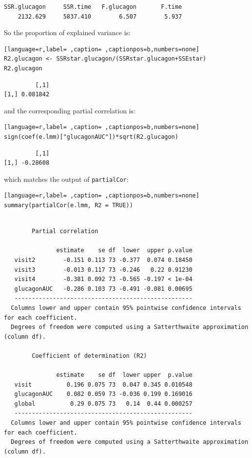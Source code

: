 \documentclass[12pt]{article}
\begin{document}
\begin{verbatim}
SSR.glucagon     SSR.time   F.glucagon       F.time 
    2132.629     5837.410        6.507        5.937
\end{verbatim}


So the proportion of explained variance is:
\begin{lstlisting}[language=r,label= ,caption= ,captionpos=b,numbers=none]
R2.glucagon <- SSRstar.glucagon/(SSRstar.glucagon+SSEstar)
R2.glucagon
\end{lstlisting}

\begin{verbatim}
         [,1]
[1,] 0.081842
\end{verbatim}


and the corresponding partial correlation is:
\begin{lstlisting}[language=r,label= ,caption= ,captionpos=b,numbers=none]
sign(coef(e.lmm)["glucagonAUC"])*sqrt(R2.glucagon)
\end{lstlisting}

\begin{verbatim}
         [,1]
[1,] -0.28608
\end{verbatim}


which matches the output of \texttt{partialCor}:
\begin{lstlisting}[language=r,label= ,caption= ,captionpos=b,numbers=none]
summary(partialCor(e.lmm, R2 = TRUE))
\end{lstlisting}

\begin{verbatim}

		Partial correlation 

               estimate    se df  lower  upper p.value
   visit2        -0.151 0.113 73 -0.377  0.074 0.18450
   visit3        -0.013 0.117 73 -0.246   0.22 0.91230
   visit4        -0.381 0.092 73 -0.565 -0.197 < 1e-04
   glucagonAUC   -0.286 0.103 73 -0.491 -0.081 0.00695
   --------------------------------------------------- 
  Columns lower and upper contain 95% pointwise confidence intervals for each coefficient.
  Degrees of freedom were computed using a Satterthwaite approximation (column df). 

		Coefficient of determination (R2)

               estimate    se df  lower upper  p.value
   visit          0.196 0.075 73  0.047 0.345 0.010548
   glucagonAUC    0.082 0.059 73 -0.036 0.199 0.169016
   global          0.29 0.075 73   0.14  0.44 0.000257
   --------------------------------------------------- 
  Columns lower and upper contain 95% pointwise confidence intervals for each coefficient.
  Degrees of freedom were computed using a Satterthwaite approximation (column df).
\end{verbatim}
\end{document}
